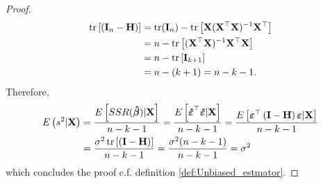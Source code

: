\begin{proof}
    \begin{align*}
        \operatorname{\text{tr}}\left[\left(\mathbf{I}_n - \mathbf{H}\right)\right] &= \operatorname{\text{tr}}(\mathbf{I}_n) - \operatorname{\text{tr}}\left[\mathbf{X}(\mathbf{X}^\top\mathbf{X})^{-1}\mathbf{X}^\top\right] \\
        &= n - \operatorname{\text{tr}}\left[ (\mathbf{X}^\top\mathbf{X})^{-1}\mathbf{X}^\top\mathbf{X} \right] \\
         &= n - \operatorname{\text{tr}}\left[\mathbf{I}_{k + 1} \right] \\
        &= n - (k + 1) = n - k - 1.
    \end{align*}
    Therefore,
    \begin{align*}
        E\left(s^2|\mathbf{X}\right) &= \frac{E\left[SSR(\operatorname{\boldsymbol{\hat{\beta}}})|\textbf{X}\right]}{n - k - 1} = \frac{E\left[\boldsymbol{\hat{\varepsilon}}^\top\boldsymbol{\hat{\varepsilon}}|\textbf{X}\right]}{n - k - 1}= \frac{ E\left[\boldsymbol{\varepsilon}^\top \left(\mathbf{I} - \mathbf{H}\right)\boldsymbol{\varepsilon}|\mathbf{X}\right]}{n - k - 1} \\ &= \frac{\sigma^2\operatorname{\text{tr}}\left[\left(\mathbf{I} - \mathbf{H}\right)\right]}{n - k - 1} = \frac{\sigma^2(n - k - 1)}{n - k - 1} = \sigma^2
    \end{align*}
    which concludes the proof c.f. definition \ref{def:Unbiased_estmator}.
\end{proof}
